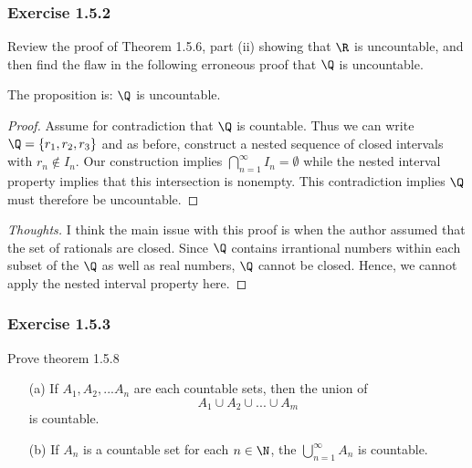 \subsubsection{Exercise 1.5.2}

Review the proof of Theorem 1.5.6, part (ii) showing that \( \R \) is uncountable, and then find the flaw in the following erroneous proof that \( \Q \) is uncountable. 

The proposition is: 
\( \Q \) is uncountable. 

\begin{proof}
Assume for contradiction that \( \Q \) is countable. Thus we can write \( \Q = \{  r_1, r_2, r_3 \}\) and as before, construct a nested sequence of closed intervals with \( r_n \not\in I_n \). Our construction implies \( \bigcap_{n=1}^{\infty} I_n = \emptyset \) while the nested interval property implies that this intersection is nonempty. This contradiction implies \( \Q \) must therefore be uncountable.
\end{proof}
\begin{proof}[Thoughts]
I think the main issue with this proof is when the author assumed that the set of rationals are closed. Since \( \Q \) contains irrantional numbers within each subset of the \( \Q \) as well as real numbers, \( \Q \) cannot be closed.  Hence, we cannot apply the nested interval property here.  
\end{proof}


\subsubsection{Exercise 1.5.3}

Prove theorem 1.5.8



\begin{theorem}{}{}
\begin{enumerate}
    \item[(a)] If \( A_1, A_2,... A_n\) are each countable sets, then the union of 
        \[ A_1 \cup A_2 \cup ... \cup A_m \] is countable.
    \item[(b)] If \( A_n \) is a countable set for each \( n \in \N \), the \( \bigcup_{n=1}^{\infty}A_n \) is countable. 
\end{enumerate}
\end{theorem}


